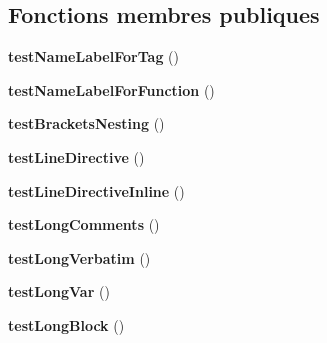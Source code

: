 \subsection*{Fonctions membres publiques}
\begin{DoxyCompactItemize}
\item 
{\bfseries test\+Name\+Label\+For\+Tag} ()\hypertarget{class_twig___tests___lexer_test_a72db2223329f89ffc1e6ee2c34726b25}{}\label{class_twig___tests___lexer_test_a72db2223329f89ffc1e6ee2c34726b25}

\item 
{\bfseries test\+Name\+Label\+For\+Function} ()\hypertarget{class_twig___tests___lexer_test_af587c0917f9add74cda297dbc81fdf33}{}\label{class_twig___tests___lexer_test_af587c0917f9add74cda297dbc81fdf33}

\item 
{\bfseries test\+Brackets\+Nesting} ()\hypertarget{class_twig___tests___lexer_test_a48480a780925b195c5ae2d586c476e82}{}\label{class_twig___tests___lexer_test_a48480a780925b195c5ae2d586c476e82}

\item 
{\bfseries test\+Line\+Directive} ()\hypertarget{class_twig___tests___lexer_test_a27e5d47e79a8192de15064edc8215a85}{}\label{class_twig___tests___lexer_test_a27e5d47e79a8192de15064edc8215a85}

\item 
{\bfseries test\+Line\+Directive\+Inline} ()\hypertarget{class_twig___tests___lexer_test_accc3077ce5ad692b25b5d08f50336174}{}\label{class_twig___tests___lexer_test_accc3077ce5ad692b25b5d08f50336174}

\item 
{\bfseries test\+Long\+Comments} ()\hypertarget{class_twig___tests___lexer_test_aa3ac0e29e08ce7eaca92c0044d6e20b5}{}\label{class_twig___tests___lexer_test_aa3ac0e29e08ce7eaca92c0044d6e20b5}

\item 
{\bfseries test\+Long\+Verbatim} ()\hypertarget{class_twig___tests___lexer_test_a690d47b5d3cab83d15217a0da00eeac2}{}\label{class_twig___tests___lexer_test_a690d47b5d3cab83d15217a0da00eeac2}

\item 
{\bfseries test\+Long\+Var} ()\hypertarget{class_twig___tests___lexer_test_aaab74739487bf1aabaa66d39c7f32698}{}\label{class_twig___tests___lexer_test_aaab74739487bf1aabaa66d39c7f32698}

\item 
{\bfseries test\+Long\+Block} ()\hypertarget{class_twig___tests___lexer_test_a674662d29c6c528f2467609d718287c7}{}\label{class_twig___tests___lexer_test_a674662d29c6c528f2467609d718287c7}


\end{DoxyCompactItemize}

